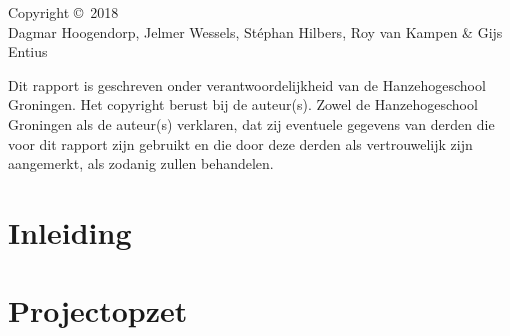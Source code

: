 \documentclass[11pt,fleqn,oneside,openany]{book} %
\begin{document}
\vfill

\begin{center}
Copyright \copyright\ 2018 \\ Dagmar Hoogendorp, Jelmer Wessels, Stéphan Hilbers, Roy van Kampen \& Gijs Entius %
\end{center}

\begin{center}
    Dit rapport is geschreven onder verantwoordelijkheid van de Hanzehogeschool Groningen.
    Het copyright berust bij de auteur(s). Zowel de Hanzehogeschool Groningen als de auteur(s) verklaren, dat
    zij eventuele gegevens van derden die voor dit rapport zijn gebruikt en die door deze
    derden als vertrouwelijk zijn aangemerkt, als zodanig zullen behandelen.\\ %
\end{center}


\usechapterimagefalse %


\pagestyle{empty} %

\tableofcontents %


\pagestyle{fancy} %


\chapter{Inleiding}

\chapter{Projectopzet}
\end{document}
